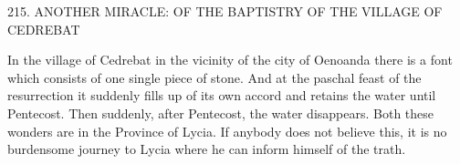 215.
ANOTHER MIRACLE: OF THE BAPTISTRY OF
THE VILLAGE OF CEDREBAT

In the village of Cedrebat in the vicinity of the city of Oenoanda
there is a font which consists of one single piece of stone.
And at
the paschal feast of the resurrection it suddenly fills up of its own
accord and retains the water until Pentecost.
Then suddenly, after
Pentecost, the water disappears.
Both these wonders are in the
Province of Lycia.
If anybody does not believe this, it is no
burdensome journey to Lycia where he can inform himself of the
trath.

